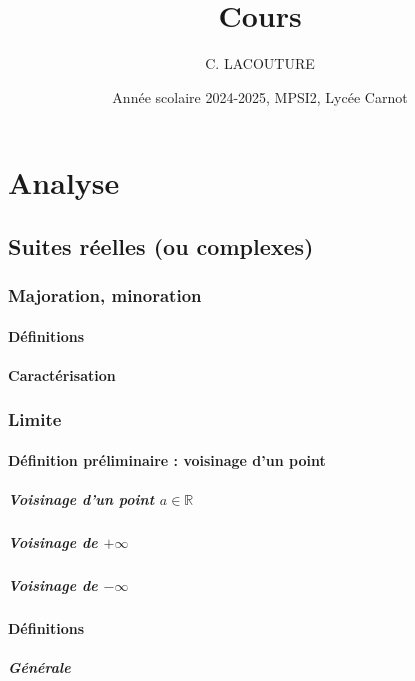 \documentclass[12pt,a4paper,french]{book}
\title{Cours}
\author{C. LACOUTURE}
\date{Année scolaire 2024-2025, MPSI2, Lycée Carnot}
\begin{document}
\maketitle
\tableofcontents

\part{Analyse}

\chapter{Suites réelles (ou complexes)}
	\section{Majoration, minoration}
		\subsection{Définitions}
		\subsection{Caractérisation}
	\section{Limite}
		\subsection{Définition préliminaire : voisinage d'un point}
			\subsubsection{Voisinage d'un point $a \in \mathbb{R}$}
			\subsubsection{Voisinage de $+\infty$}
			\subsubsection{Voisinage de $-\infty$}
		\subsection{Définitions}
			\subsubsection{Générale}
\end{document}
